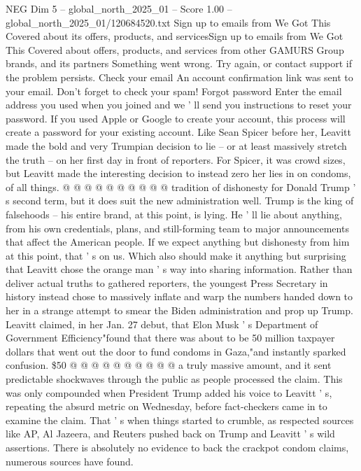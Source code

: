 \begin{textsample}{NEG Dim 5 – global\_north\_2025\_01 – Score 1.00 – global\_north\_2025\_01/120684520.txt}  \label{ex:f5_neg_190}
Sign up to emails from We Got This Covered about its offers, products, and servicesSign up to emails from We Got This Covered about offers, products, and services from other GAMURS Group brands, and its partners Something went wrong.
Try again, or contact support if the problem persists.
Check your email An account confirmation link was sent to your email.
Don't forget to check your spam!
Forgot password Enter the email address you used when you joined and we ' ll send you instructions to reset your password.
If you used Apple or Google to create your account, this process will create a password for your existing account.
Like Sean Spicer before her, Leavitt made the bold and very Trumpian decision to lie -- or at least massively stretch the truth -- on her first day in front of reporters.
For Spicer, it was crowd sizes, but Leavitt made the interesting decision to instead zero her lies in on condoms, of all things. @ @ @ @ @ @ @ @ @ @ tradition of dishonesty for Donald Trump ' s second term, but it does suit the new administration well.
Trump is the king of falsehoods -- his entire brand, at this point, is lying.
He ' ll lie about anything, from his own credentials, plans, and still-forming team to major announcements that affect the American people.
If we expect anything but dishonesty from him at this point, that ' s on us.
Which also should make it anything but surprising that Leavitt chose the orange man ' s way into sharing information.
Rather than deliver actual truths to gathered reporters, the youngest Press Secretary in history instead chose to massively inflate and warp the numbers handed down to her in a strange attempt to smear the Biden administration and prop up Trump.
Leavitt claimed, in her Jan. 27 debut, that Elon Musk ' s Department of Government Efficiency"found that there was about to be 50 million taxpayer dollars that went out the door to fund condoms in Gaza,"and instantly sparked confusion. \$50 @ @ @ @ @ @ @ @ @ @ a truly massive amount, and it sent predictable shockwaves through the public as people processed the claim.
This was only compounded when President Trump added his voice to Leavitt ' s, repeating the absurd metric on Wednesday, before fact-checkers came in to examine the claim.
That ' s when things started to crumble, as respected sources like AP, Al Jazeera, and Reuters pushed back on Trump and Leavitt ' s wild assertions.
There is absolutely no evidence to back the crackpot condom claims, numerous sources have found.

\end{textsample}
